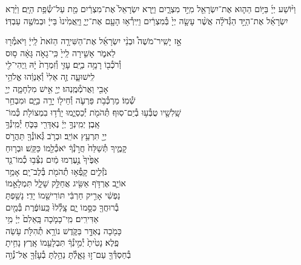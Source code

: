 \documentclass[twoside, openany, parskip=half, 11pt]{book}
\begin{document}
וַיּ֨וֹשַׁע
יְיָ֜ בַּיּ֥וֹם הַה֛וּא אֶת־יִשְׂרָאֵ֖ל מִיַּ֣ד מִצְרָ֑יִם וַיַּ֤רְא יִשְׂרָאֵל֙ אֶת־מִצְרַ֔יִם מֵ֖ת עַל־שְׂ֯פַ֥ת הַיָּֽם׃
וַיַּ֨רְא יִשְׂרָאֵ֜ל אֶת־הַיָּ֣ד הַגְּ֯דֹלָ֗ה אֲשֶׁ֨ר עָשָׂ֤ה יְיָ֙ בְּ֯מִצְרַ֔יִם וַיִּֽירְ֯א֥וּ הָעָ֖ם אֶת־יְיָ֑ וַיַּֽאֲמִ֙ינוּ֙ בַּייָ֔ וּבְמֹשֶׁ֖ה עַבְדּֽוֹ׃


אָ֣ז \hfill
יָשִֽׁיר־מֹשֶׁה֩ \hfill וּבְנֵ֨י \hfill יִשְׂרָאֵ֜ל \hfill אֶת־הַשִּׁירָ֤ה \hfill הַזֹּאת֙ \hfill לַֽייָ֔ \hfill וַיֹּאמְ֯ר֖וּ \\
לֵאמֹ֑ר \hfill אָשִׁ֤ירָה לַֽייָ֙ כִּֽי־גָאֹ֣ה גָּאָ֔ה \hfill ס֥וּס \\
וְ֯רֹכְ֯ב֖וֹ רָמָ֥ה בַיָּֽם׃ \hfill עׇזִּ֤י וְ֯זִמְרָת֙ יָ֔הּ וַֽיְהִי־לִ֖י \\
לִֽישׁוּעָ֑ה \hfill זֶ֤ה אֵלִי֙ וְ֯אַנְוֵ֔הוּ \hfill אֱלֹהֵ֥י \\
אָבִ֖י וַאֲרֹמְ֯מֶֽנְהוּ׃ \hfill יְיָ֖ אִ֣ישׁ מִלְחָמָ֑ה יְיָ֖ \\
שְׁ֯מֽוֹ׃ \hfill מַרְכְּ֯בֹ֥ת פַּרְעֹ֛ה וְ֯חֵיל֖וֹ יָרָ֣ה בַיָּ֑ם \hfill וּמִבְחַ֥ר\\
שָֽׁלִשָׁ֖יו טֻבְּ֯ע֥וּ בְ֯יַם־סֽוּף׃ \hfill תְּ֯הֹמֹ֖ת יְ֯כַסְיֻ֑מוּ יָרְ֯ד֥וּ בִמְצוֹלֹ֖ת כְּ֯מוֹ־\\
אָֽבֶן׃ \hfill יְמִֽינְךָ֣ יְיָ֔ נֶאְדָּרִ֖י בַּכֹּ֑חַ \hfill יְ֯מִֽינְ֯ךָ֥ \\
יְיָ֖ תִּרְעַ֥ץ אוֹיֵֽב׃ \hfill וּבְרֹ֥ב גְּ֯אוֹנְ֯ךָ֖ תַּהֲרֹ֣ס \\
קָמֶ֑יךָ \hfill תְּ֯שַׁלַּח֙ חֲרֹ֣נְ֯ךָ֔ יֹאכְ֯לֵ֖מוֹ כַּקַּֽשׁ׃ \hfill וּבְר֤וּחַ \\
אַפֶּ֙יךָ֙ נֶ֣עֶרְמוּ מַ֔יִם \hfill נִצְּ֯ב֥וּ כְ֯מוֹ־נֵ֖ד \\
נֹזְ֯לִ֑ים \hfill קָֽפְ֯א֥וּ תְ֯הֹמֹ֖ת בְּ֯לֶב־יָֽם׃ \hfill אָמַ֥ר \\
אוֹיֵ֛ב אֶרְדֹּ֥ף אַשִּׂ֖יג \hfill אֲחַלֵּ֣ק שָׁלָ֑ל תִּמְלָאֵ֣מוֹ \\
נַפְשִׁ֔י \hfill אָרִ֣יק חַרְבִּ֔י תּוֹרִישֵׁ֖מוֹ יָדִֽי׃ \hfill נָשַׁ֥פְתָּ \\
בְ֯רוּחֲךָ֖ כִּסָּ֣מוֹ יָ֑ם \hfill צָֽלְ֯לוּ֙ כַּֽעוֹפֶ֔רֶת בְּ֯מַ֖יִם \\
אַדִּירִֽים׃ \hfill מִֽי־כָמֹ֤כָה בָּֽאֵלִם֙ יְיָ֔ \hfill מִ֥י \\
כָּמֹ֖כָה נֶאְדָּ֣ר בַּקֹּ֑דֶשׁ \hfill נוֹרָ֥א תְ֯הִלֹּ֖ת עֹ֥שֵׂה \\
פֶֽלֶא׃ \hfill נָטִ֙יתָ֙ יְ֯מִ֣ינְ֯ךָ֔ תִּבְלָעֵ֖מוֹ אָֽרֶץ׃ \hfill נָחִ֥יתָ \\
בְ֯חַסְדְּ֯ךָ֖ עַם־ז֣וּ גָּאָ֑לְ֯תָּ \hfill נֵהַ֥לְתָּ בְ֯עׇזְּ֯ךָ֖ אֶל־נְ֯וֵ֥ה \\
\end{document}
